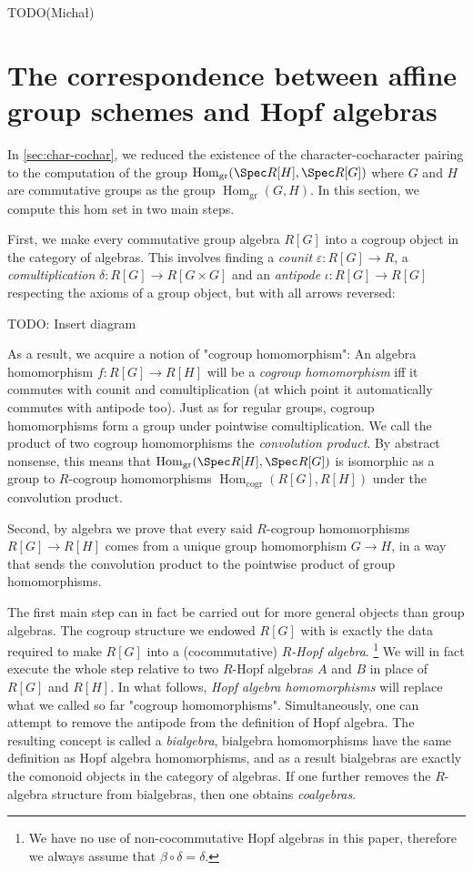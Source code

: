 \documentclass{article}
\newcommand{\eps}{\varepsilon}
\newcommand{\Homgr}{\Hom_{\mathrm{gr}}}
\newcommand{\Homcogr}{\Hom_{\mathrm{cogr}}}
\DeclareMathOperator{\Hom}{Hom}
\begin{document}
TODO(Michał)



\section{The correspondence between affine group schemes and Hopf algebras}


In \cref{sec:char-cochar}, we reduced the existence of the character-cocharacter pairing
to the computation of the group $\Homgr(\Spec R[H], \Spec R[G])$
where $G$ and $H$ are commutative groups as the group $\Homgr(G, H)$.
In this section, we compute this hom set in two main steps.

First, we make every commutative group algebra $R[G]$
into a cogroup object in the category of algebras.
This involves finding a \emph{counit} $\eps : R[G] \to R$,
a \emph{comultiplication} $\delta : R[G] \to R[G \times G]$
and an \emph{antipode} $\iota : R[G] \to R[G]$
respecting the axioms of a group object, but with all arrows reversed:

TODO: Insert diagram

As a result, we acquire a notion of "cogroup homomorphism":
An algebra homomorphism $f : R[G] \to R[H]$ will be a \emph{cogroup homomorphism} iff
it commutes with counit and comultiplication
(at which point it automatically commutes with antipode too).
Just as for regular groups, cogroup homomorphisms form a group under pointwise comultiplication.
We call the product of two cogroup homomorphisms the \emph{convolution product}.
By abstract nonsense, this means that $\Homgr(\Spec R[H], \Spec R[G])$ is isomorphic as a group to
$R$-cogroup homomorphisms $\Homcogr(R[G], R[H])$ under the convolution product.

Second, by algebra we prove that every said $R$-cogroup homomorphisms $R[G] \to R[H]$
comes from a unique group homomorphism $G \to H$,
in a way that sends the convolution product to the pointwise product of group homomorphisms.

The first main step can in fact be carried out for more general objects than group algebras.
The cogroup structure we endowed $R[G]$ with is exactly the data required
to make $R[G]$ into a (cocommutative) \emph{$R$-Hopf algebra}.
\footnote{We have no use of non-cocommutative Hopf algebras in this paper,
therefore we always assume that $\beta \circ \delta = \delta$.}
We will in fact execute the whole step
relative to two $R$-Hopf algebras $A$ and $B$ in place of $R[G]$ and $R[H]$.
In what follows, \emph{Hopf algebra homomorphisms} will replace what we called so far
"cogroup homomorphisms".
Simultaneously, one can attempt to remove the antipode from the definition of Hopf algebra.
The resulting concept is called a \emph{bialgebra},
bialgebra homomorphisms have the same definition as Hopf algebra homomorphisms,
and as a result bialgebras are exactly the comonoid objects in the category of algebras.
If one further removes the $R$-algebra structure from bialgebras,
then one obtains \emph{coalgebras}.
\end{document}
